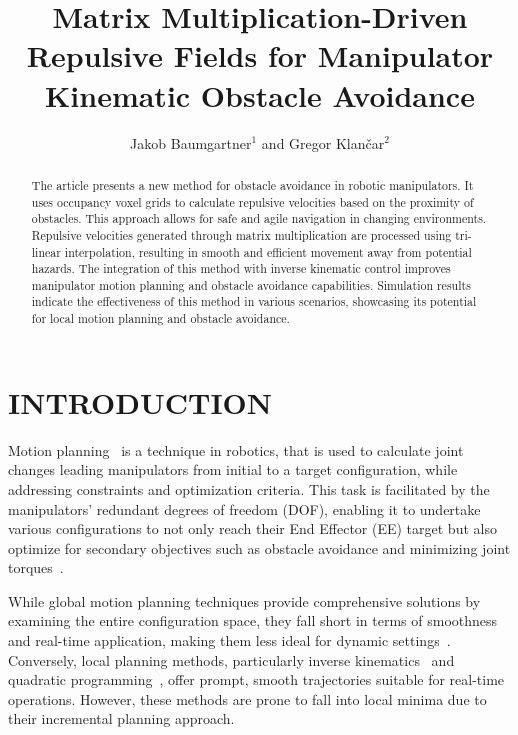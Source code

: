 \documentclass[letterpaper, 10 pt, conference]{ieeeconf}  %
\title{\LARGE \bf
Matrix Multiplication-Driven Repulsive Fields for Manipulator Kinematic Obstacle Avoidance
}
\author{
	Jakob Baumgartner$^{1}$ and Gregor Klančar$^{2}$%
}
\begin{document}
\maketitle
\thispagestyle{empty}
\pagestyle{empty}


\begin{abstract}

The article presents a new method for obstacle avoidance in robotic manipulators. It uses occupancy voxel grids to calculate repulsive velocities based on the proximity of obstacles. This approach allows for safe and agile navigation in changing environments. Repulsive velocities generated through matrix multiplication are processed using tri-linear interpolation, resulting in smooth and efficient movement away from potential hazards. The integration of this method with inverse kinematic control improves manipulator motion planning and obstacle avoidance capabilities. Simulation results indicate the effectiveness of this method in various scenarios, showcasing its potential for local motion planning and obstacle avoidance.

\end{abstract}

\section{INTRODUCTION}

Motion planning~\cite{c52} is a technique in robotics, that is used to calculate joint changes leading manipulators from initial to a target configuration, while addressing constraints and optimization criteria. This task is facilitated by the manipulators' redundant degrees of freedom (DOF), enabling it to undertake various configurations to not only reach their End Effector (EE) target but also optimize for secondary objectives such as obstacle avoidance and minimizing joint torques~\cite{siciliano1990kinematic}.

While global motion planning techniques provide comprehensive solutions by examining the entire configuration space, they fall short in terms of smoothness and real-time application, making them less ideal for dynamic settings~\cite{lavalle1998rapidly, gammell2015batch, karaman2010incremental,kuffner2000rrt}. Conversely, local planning methods, particularly inverse kinematics~\cite{c29,c38} and quadratic programming~\cite{c21,c23, haviland2021neo}, offer prompt, smooth trajectories suitable for real-time operations. However, these methods are prone to fall into local minima due to their incremental planning approach.
\end{document}
